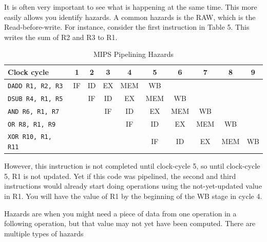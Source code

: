 \documentclass{article}
\begin{document}
It is often very important to see what is happening at the same time. This more easily allows you identify hazards. A common hazards is the RAW, which is the Read-before-write. For instance, consider the first instruction in Table 5. This writes the sum of R2 and R3 to R1. 

\begin{table}[H]
\small
\centering
\caption{MIPS Pipelining Hazards}
\begin{tabular}{lccccccccc}
\toprule
\textbf{Clock cycle} 		& 1 	& 2 	& 3 	& 4 	& 5 	& 6 	& 7 	& 8 	& 9   	\\ 
\midrule
\texttt{DADD R1, R2, R3} 	& IF 	& ID 	& EX 	& MEM 	& WB  	& 		& 		& 		&  		\\
\texttt{DSUB R4, R1, R5} 	&		& IF 	& ID 	& EX 	& MEM 	& WB  	& 		& 		& 		\\
\texttt{AND  R6, R1, R7} 	&		&		& IF 	& ID 	& EX 	& MEM 	& WB  	& 		& 	  	\\
\texttt{OR   R8, R1, R9} 	&		&		&		& IF 	& ID 	& EX 	& MEM 	& WB  	&  	  	\\
\texttt{XOR  R10, R1, R11} 	&		&		&		&		& IF 	& ID 	& EX 	& MEM 	& WB  	\\
\bottomrule
\end{tabular}
\end{table}

However, this instruction is not completed until clock-cycle 5, so until clock-cycle 5, R1 is not updated. Yet if this code was pipelined, the second and third instructions would already start doing operations using the not-yet-updated value in R1. You will have the value of R1 by the beginning of the WB stage in cycle 4.


Hazards are when you might need a piece of data from one operation in a following operation, but that value may not yet have been computed. There are multiple types of hazards
\end{document}
